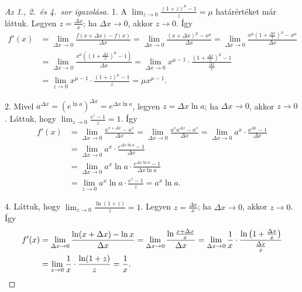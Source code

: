 \documentclass[11pt]{article}
\begin{document}
\begin{proof}[Az 1., 2.\ és 4.\ sor igazolása]
1. A $\displaystyle\lim_{z\to 0}\frac{(1+z)^{\mu}-1}{z}=\mu$ határértéket már láttuk. Legyen $z=\frac{\Delta x}{x}$; ha $\Delta x\to 0$, akkor $z\to 0$. Így
\begin{align*}
f'(x)&=\lim_{\Delta x\to 0}\frac{f(x+\Delta x)-f(x)}{\Delta x}
=\lim_{\Delta x\to 0}\frac{(x+\Delta x)^{\mu}-x^{\mu}}{\Delta x}
=\lim_{\Delta x\to 0}\frac{x^{\mu}\left(1+\frac{\Delta x}{x}\right)^{\mu}-x^{\mu}}{\Delta x}\\
&=\lim_{\Delta x\to 0}\frac{x^{\mu}\left(\left(1+\frac{\Delta x}{x}\right)^{\mu}-1\right)}{\Delta x}
=\lim_{\Delta x\to 0}x^{\mu-1}\cdot\frac{\left(1+\frac{\Delta x}{x}\right)^{\mu}-1}{\frac{\Delta x}{x}}\\
&=\lim_{z\to 0}x^{\mu-1}\cdot\frac{(1+z)^{\mu}-1}{z}=\mu x^{\mu-1}.
\end{align*}

2. Mivel $a^{\Delta x}=\left(e^{\ln a}\right)^{\Delta x}=e^{\Delta x\ln a}$, legyen $z=\Delta x\ln a$; ha $\Delta x\to 0$, akkor $z\to 0$. Láttuk, hogy $\displaystyle\lim_{z\to 0}\frac{e^{z}-1}{z}=1$. Így
\begin{align*}
f'(x)&=\lim_{\Delta x\to 0}\frac{a^{x+\Delta x}-a^{x}}{\Delta x}
=\lim_{\Delta x\to 0}\frac{a^{x}a^{\Delta x}-a^{x}}{\Delta x}
=\lim_{\Delta x\to 0}a^{x}\cdot\frac{a^{\Delta x}-1}{\Delta x}\\
&=\lim_{\Delta x\to 0}a^{x}\cdot\frac{e^{\Delta x\ln a}-1}{\Delta x}\\
&=\lim_{\Delta x\to 0}a^{x}\ln a\cdot\frac{e^{\Delta x\ln a}-1}{\Delta x\ln a}\\
&=\lim_{z\to 0}a^{x}\ln a\cdot\frac{e^{z}-1}{z}=a^{x}\ln a .
\end{align*}

4. Láttuk, hogy $\displaystyle\lim_{z\to 0}\frac{\ln(1+z)}{z}=1$. Legyen $z=\frac{\Delta x}{x}$; ha $\Delta x\to 0$, akkor $z\to 0$. Így
\begin{align*}
f'(x)&=\lim_{\Delta x\to 0}\frac{\ln(x+\Delta x)-\ln x}{\Delta x}
=\lim_{\Delta x\to 0}\frac{\ln\frac{x+\Delta x}{x}}{\Delta x}
=\lim_{\Delta x\to 0}\frac{1}{x}\cdot\frac{\ln\left(1+\frac{\Delta x}{x}\right)}{\frac{\Delta x}{x}}\\
&=\lim_{z\to 0}\frac{1}{x}\cdot\frac{\ln(1+z)}{z}=\frac{1}{x}. \qedhere
\end{align*}
\end{proof}

\end{document}
